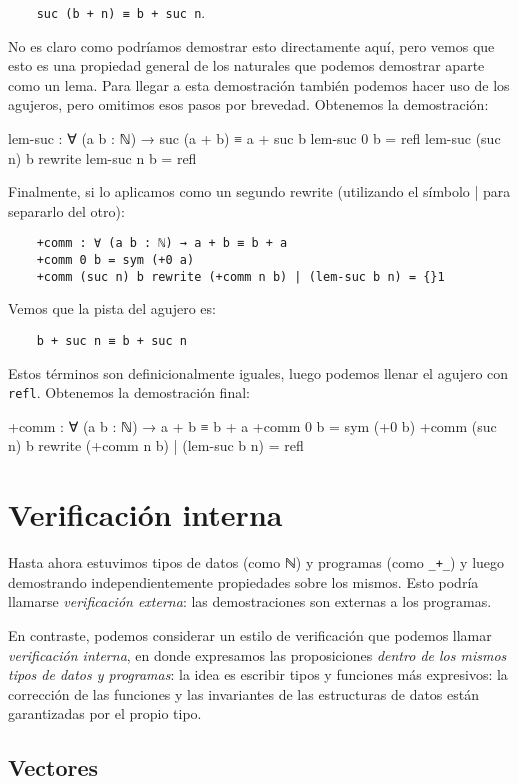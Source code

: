 \documentclass[11pt]{article} %
\begin{document}
\verb|    suc (b + n) ≡ b + suc n|.

No es claro como podríamos demostrar esto directamente aquí, pero vemos que esto es una propiedad general de los naturales que podemos demostrar aparte como un lema. 
Para llegar a esta demostración también podemos hacer uso de los agujeros, pero omitimos esos pasos por brevedad. Obtenemos la demostración:

\begin{code}
lem-suc : ∀ (a b : ℕ) → suc (a + b) ≡ a + suc b
lem-suc 0 b = refl
lem-suc (suc n) b rewrite lem-suc n b = refl
\end{code}


Finalmente, si lo aplicamos como un segundo rewrite (utilizando el símbolo | para separarlo del otro):

\begin{verbatim}
    +comm : ∀ (a b : ℕ) → a + b ≡ b + a
    +comm 0 b = sym (+0 a)
    +comm (suc n) b rewrite (+comm n b) | (lem-suc b n) = {}1 
\end{verbatim}

Vemos que la pista del agujero es:

\verb|    b + suc n ≡ b + suc n|

Estos términos son definicionalmente iguales, luego podemos llenar el agujero con \verb|refl|. Obtenemos la demostración final:


\begin{code}
+comm : ∀ (a b : ℕ) → a + b ≡ b + a
+comm 0 b = sym (+0 b)
+comm (suc n) b rewrite (+comm n b) | (lem-suc b n) = refl   
\end{code}

\section{Verificación interna}
Hasta ahora estuvimos tipos de datos (como ℕ) y programas (como \verb|_+_|) y luego demostrando independientemente propiedades sobre los mismos. Esto podría llamarse \textit{verificación externa}: las demostraciones son externas a los programas.

En contraste, podemos considerar un estilo de verificación que podemos llamar \textit{verificación interna}, en donde expresamos las proposiciones \textit{dentro de los mismos tipos de datos y programas}: la idea es escribir tipos y funciones más expresivos: la corrección de las funciones y las invariantes de las estructuras de datos están garantizadas por el propio tipo.
\newpage
\subsection{Vectores}
\end{document}
